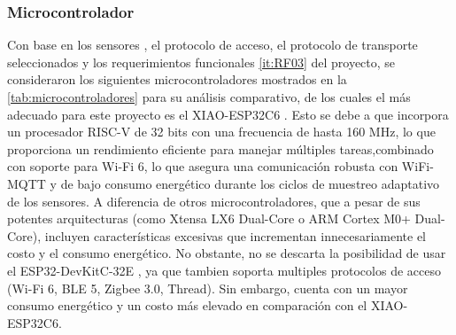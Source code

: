 \subsubsection{Microcontrolador}

Con base en los sensores , el protocolo de acceso, el protocolo de transporte seleccionados y los requerimientos funcionales \ref{it:RF03}  del proyecto,
se consideraron los siguientes microcontroladores mostrados en la \cref{tab:microcontroladores} 
para su análisis comparativo, de los cuales el más adecuado para este proyecto 
es el XIAO-ESP32C6 \cite{zotero-item-58}.
Esto se debe  a que incorpora un procesador RISC-V de 32 bits con una frecuencia
de hasta 160 MHz, lo que proporciona un rendimiento eficiente para manejar 
múltiples tareas,combinado con soporte para Wi-Fi 6, 
lo que asegura una comunicación robusta con WiFi-MQTT y de bajo 
consumo energético durante los ciclos de muestreo adaptativo de los sensores.
\newline 
A diferencia de otros microcontroladores, que a pesar de sus potentes 
arquitecturas (como Xtensa LX6 Dual-Core o ARM Cortex M0+
Dual-Core), incluyen características 
excesivas que incrementan innecesariamente el costo y el consumo energético.
No obstante, no se descarta la posibilidad de usar el ESP32-DevKitC-32E \cite{Embajadores}, 
ya que tambien soporta multiples protocolos de acceso (Wi-Fi 6, BLE 5,
Zigbee 3.0, Thread). Sin embargo,
cuenta con un mayor consumo energético y un costo 
más elevado en comparación con el XIAO-ESP32C6.


